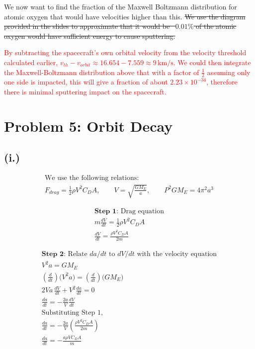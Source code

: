 \documentclass[11pt]{article}
\begin{document}
\hspace*{2em}We now want to find the fraction of the Maxwell Boltzmann distribution
for atomic oxygen that would have velocities higher than this. \sout{We use the diagram provided in
the slides to approximate that it would be ~$0.01\%$ of the atomic oxygen would have sufficient energy
to cause sputtering.}

\textcolor{red}{By subtracting the spacecraft's own orbital velocity from the velocity threshold calculated earlier,
$v_{th} - v_{orbit} \approx 16.654 - 7.559 \approx 9 \, \mathrm{km/s}$. We could then integrate the
Maxwell-Boltzmann distribution above that with a factor of $\frac{1}{2}$ assuming only one side is impacted,
this will give a fraction of about
$2.23\times10^{-34}$, therefore there is minimal sputtering impact on the spacecraft.}

\newpage
\section*{Problem 5: Orbit Decay}
\subsection*{(i.)}
\[
\begin{gathered}
\text{We use the following relations:} \\
F_{drag} = \frac{1}{2} \rho V^2 C_D A, \qquad
V = \sqrt{\frac{G M_E}{a}}, \qquad
P^2 G M_E = 4 \pi^2 a^3
\end{gathered}
\]

\[
\begin{gathered}
\textbf{Step 1:} \text{ Drag equation} \\
m \frac{dV}{dt} = \frac{1}{2} \rho V^2 C_D A \\
\frac{dV}{dt} = \frac{\rho V^2 C_D A}{2m}
\end{gathered}
\]

\[
\begin{gathered}
\textbf{Step 2:} \text{ Relate } da/dt \text{ to } dV/dt \text{ with the velocity equation} \\
V^2 a = G M_E \\
\left(\frac{d}{dt}\right)\Big(V^2 a\Big) = \left(\frac{d}{dt}\right)\Big(G M_E\Big) \\
2Va\,\frac{dV}{dt} + V^2 \frac{da}{dt} = 0 \\
\frac{da}{dt} = -\frac{2a}{V}\frac{dV}{dt} \\
\text{Substituting Step 1,} \\
\frac{da}{dt} = -\frac{2a}{V}\left(\frac{\rho V^2 C_D A}{2m}\right) \\
\frac{da}{dt} = -\frac{a \rho V C_D A}{m}
\end{gathered}
\]
\end{document}
